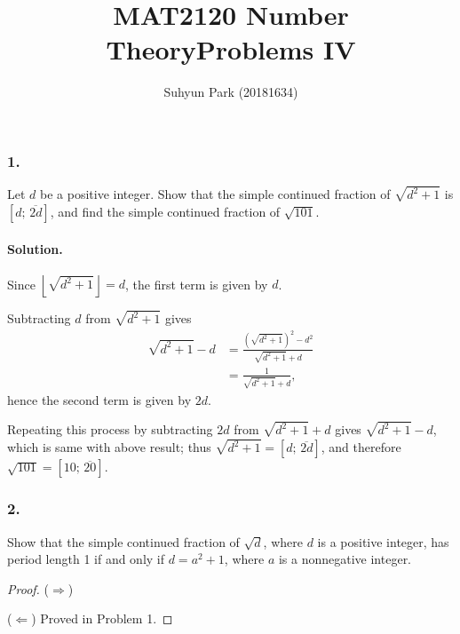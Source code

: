 



\title{MAT2120 Number Theory\newline\space Problems IV}
\author{Suhyun Park (20181634)}

\maketitle

\subsubsection{1.} Let $d$ be a positive integer. Show that the simple continued fraction of $\sqrt{d^2+1}$ is
$\left[d;\,\overline{2d}\right]$, and find the simple continued fraction of $\sqrt{101}$.

\paragraph{Solution.} Since $\left\lfloor\sqrt{d^2+1}\right\rfloor=d$, the first term is given by $d$.

Subtracting $d$ from $\sqrt{d^2+1}$ gives
\begin{align*}
    \sqrt{d^2+1}-d &= \frac{\left(\sqrt{d^2+1}\right)^2-d^2}{\sqrt{d^2+1}+d} \\
    &= \frac{1}{\sqrt{d^2+1}+d},
\end{align*}
hence the second term is given by $2d$.

Repeating this process by subtracting $2d$ from $\sqrt{d^2+1}+d$ gives $\sqrt{d^2+1}-d$, which is same with above result;
thus $\sqrt{d^2+1}=\left[d;\,\overline{2d}\right]$, and therefore $\sqrt{101}=\left[10;\,\overline{20}\right]$.

\subsubsection{2.} Show that the simple continued fraction of $\sqrt{d}$, where $d$ is a positive integer,
has period length 1 if and only if $d=a^2+1$, where $a$ is a nonnegative integer.

\begin{proof}
    ($\Rightarrow$) 

    ($\Leftarrow$) Proved in Problem 1.
\end{proof}

